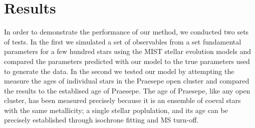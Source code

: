 \section{Results}
\label{section:results}




In order to demonstrate the performance of our method, we conducted two sets
of tests.
In the first we simulated a set of observables from a set fundamental
parameters for a few hundred stars using the MIST stellar evolution models and
compared the parameters predicted with our model to the true parameters used
to generate the data.
In the second we tested our model by attempting the measure the ages of
individual stars in the Praesepe open cluster and compared the results to the
establised age of Praesepe.
The age of Praesepe, like any open cluster, has been measured precisely
because it is an ensemble of coeval stars with the same metallicity; a single
stellar poplulation, and its age can be precisely established through
isochrone fitting and MS turn-off.

